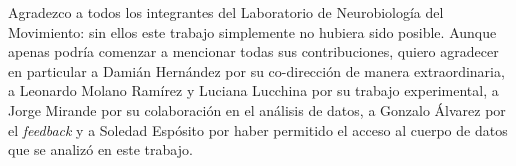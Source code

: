 \begin{agradecimientos}
	Agradezco a todos los integrantes del Laboratorio de Neurobiología del Movimiento: sin ellos este trabajo simplemente no hubiera sido posible. Aunque apenas podría comenzar a mencionar todas sus contribuciones, quiero agradecer en particular a Damián Hernández por su co-dirección de manera extraordinaria, a Leonardo Molano Ramírez y Luciana Lucchina por su trabajo experimental, a Jorge Mirande por su colaboración en el análisis de datos, a Gonzalo Álvarez por el \textit{feedback} y a Soledad Espósito por haber permitido el acceso al cuerpo de datos que se analizó en este trabajo.
	
\end{agradecimientos}
